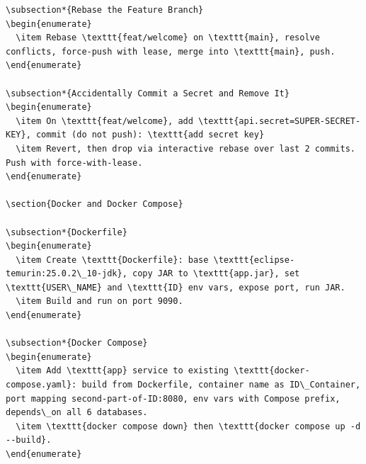 \documentclass[a4paper]{article}
\begin{document}
\begin{enumerate}
\begin{lstlisting}
\subsection*{Rebase the Feature Branch}
\begin{enumerate}
  \item Rebase \texttt{feat/welcome} on \texttt{main}, resolve conflicts, force-push with lease, merge into \texttt{main}, push.
\end{enumerate}

\subsection*{Accidentally Commit a Secret and Remove It}
\begin{enumerate}
  \item On \texttt{feat/welcome}, add \texttt{api.secret=SUPER-SECRET-KEY}, commit (do not push): \texttt{add secret key}
  \item Revert, then drop via interactive rebase over last 2 commits. Push with force-with-lease.
\end{enumerate}

\section{Docker and Docker Compose}

\subsection*{Dockerfile}
\begin{enumerate}
  \item Create \texttt{Dockerfile}: base \texttt{eclipse-temurin:25.0.2\_10-jdk}, copy JAR to \texttt{app.jar}, set \texttt{USER\_NAME} and \texttt{ID} env vars, expose port, run JAR.
  \item Build and run on port 9090.
\end{enumerate}

\subsection*{Docker Compose}
\begin{enumerate}
  \item Add \texttt{app} service to existing \texttt{docker-compose.yaml}: build from Dockerfile, container name as ID\_Container, port mapping second-part-of-ID:8080, env vars with Compose prefix, depends\_on all 6 databases.
  \item \texttt{docker compose down} then \texttt{docker compose up -d --build}.
\end{enumerate}


\end{lstlisting}
\end{enumerate}
\end{document}
